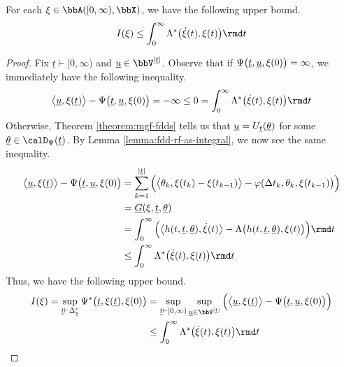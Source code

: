 \begin{proposition}
  \label{proposition:rf-upper-bound}
  For each $\pathVar \in \acpathSpace{[0,\infty)}{\stateSpace}$, we have the following upper bound.
  \begin{equation*}
    \rf(\pathVar) \leq \int_0^\infty \ode^*\big(\dot\pathVar(t), \pathVar(t)\big) \rmd t
  \end{equation*}
\end{proposition}
\begin{proof}
  Fix $\underline t \vdash [0,\infty)$ and $\underline\momentVar \in \vecSpace^{|\underline t|}$.
  Observe that if $\Psi\big(\underline t, \underline{u}, \xi(0)\big) = \infty$, we immediately have the following inequality.
  \begin{equation*}
    \bprj{\underline\momentVar}{\pathVar(\underline t)} - \aff\big(\underline t, \underline\momentVar, \pathVar(0)\big) = -\infty \leq 0 = \int_0^\infty \ode^*\big(\dot\pathVar(t), \pathVar(t)\big) \rmd t
  \end{equation*}
  Otherwise, Theorem \ref{theorem:mgf-fdds} tells us that $\underline{u} = U_{\underline t}(\underline{\theta})$ for some $\underline\twistVar \in \momentSpace(\underline t)$.
  By Lemma \ref{lemma:fdd-rf-as-integral}, we now see the same inequality.
  \begin{align*}
    \bprj{\underline\momentVar}{\pathVar(\underline t)} - \aff\big(\underline t, \underline\momentVar, \pathVar(0)\big) 
    &= \sum_{k=1}^{|\underline t|} \Big(\bprj{\twistVar_k}{\pathVar(t_k)-\pathVar(t_{k-1})} - \affShift(\Delta t_k, \twistVar_k, \pathVar(t_{k-1}) \big)\Big) \\
    &= \fddRf(\pathVar, \underline t, \underline\twistVar) \\
    &= \int_0^\infty \Big( \bprj{\twistFunc(t,\underline t,\underline\twistVar)}{\dot\pathVar(t)} - \ode\big(\twistFunc(t, \underline t, \underline\twistVar), \pathVar(t)\big) \Big) \rmd t \\
    &\leq \int_0^\infty \ode^*\big(\dot\pathVar(t), \pathVar(t)\big) \rmd t
  \end{align*}
  Thus, we have the following upper bound.
  \begin{align*}
    \rf(\pathVar) 
    = \sup_{\underline t \vdash \Delta_\pathVar^c} \aff^*\big(\underline t, \pathVar(\underline t), \pathVar(0)\big)
    &= \sup_{\underline t \vdash [0,\infty)} \sup_{\underline\momentVar \in \vecSpace^{|\underline t|}} \Big( \bprj{\underline\momentVar}{\pathVar(\underline t)} - \aff\big(\underline t, \underline\momentVar, \pathVar(0)\big) \Big) \\
    &\leq \int_0^\infty \ode^*\big(\dot\pathVar(t), \pathVar(t)\big) \rmd t
  \end{align*}
\end{proof}

